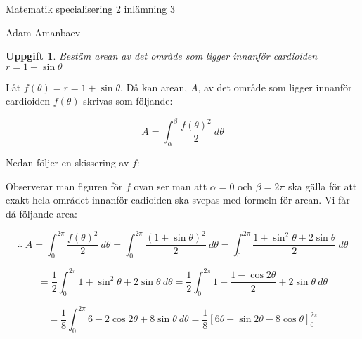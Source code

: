 \documentclass{article}
\newtheorem{thr}{Uppgift}
\begin{document}


\newpage

\centerline{\large Matematik specialisering 2 inlämning 3}

\vskip 0.1cm

\centerline{\scriptsize Adam Amanbaev}

\begin{thr}
Bestäm arean av det område som ligger innanför cardioiden $r=1+\sin\theta$
\end{thr}

Låt $f(\theta)=r=1+\sin\theta$. Då kan arean, $A$, av det område som ligger innanför cardioiden $f(\theta)$ skrivas som följande:

$$
A=
\int_{\alpha}^{\beta} \frac{f(\theta)^2}{2} \: d\theta
$$

\vskip 0.2cm

Nedan följer en skissering av $f$:

\begin{figure}[h]
    \center
\end{figure}

Observerar man figuren för $f$ ovan ser man att $\alpha=0$ och $\beta=2\pi$ ska gälla för att exakt hela området innanför cadioiden ska svepas med formeln för arean. Vi får då följande area:

$$
\therefore 
\;
A=
\int_{0}^{2\pi} \frac{f(\theta)^2}{2} \: d\theta
=
\int_{0}^{2\pi} \frac{(1+\sin\theta)^2}{2} \: d\theta
=
\int_{0}^{2\pi} \frac{1+\sin^2 \theta+2\sin\theta}{2} \: d\theta
$$

$$
=
\frac{1}{2}
\int_{0}^{2\pi} 1+\sin^2 \theta+2\sin\theta \: d\theta
=
\frac{1}{2}
\int_{0}^{2\pi} 1+\frac{1-\cos 2\theta}{2}+2\sin\theta \: d\theta
$$

$$
=
\frac{1}{8}
\int_{0}^{2\pi} 6-2\cos 2\theta+8\sin\theta \: d\theta
=
\frac{1}{8}
\left[6\theta-\sin2\theta-8\cos\theta \right]_{0}^{2\pi}
$$
\end{document}
